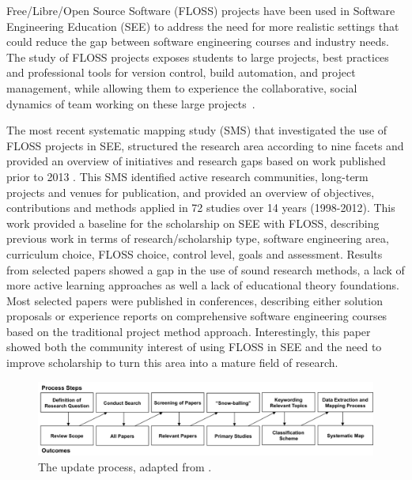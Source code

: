 
Free/Libre/Open Source Software (FLOSS) projects
have been used in Software Engineering Education (SEE)
to address the need for more realistic settings
that could reduce the gap between
software engineering courses and industry needs.
The study of FLOSS projects exposes students to 
large projects, best practices and professional tools 
for version control, build automation, and project management, 
while allowing them to experience the collaborative, social dynamics of team working on these large projects~\cite{Horstmann:2009}.

The most recent systematic mapping study (SMS)  \cite{Petersen,Budgen}
that investigated the use of FLOSS projects in SEE,
structured the research area according to nine facets and
provided an overview of initiatives and research gaps
based on work published prior to 2013 \cite{2015:CSE:nascimento}.
This SMS identified active research communities, long-term projects and venues for publication, and provided an overview of objectives, contributions and methods applied in 72 studies over 14 years (1998-2012). 
This work provided a baseline for the scholarship on SEE with FLOSS, describing previous work in terms of research/scholarship type, software engineering area, curriculum choice, FLOSS choice, control level, goals and assessment. Results from selected papers showed a gap in the use of sound research methods, a lack of more active learning approaches as well a lack of educational theory foundations. Most selected papers were published in conferences, describing either solution proposals or experience reports on comprehensive software engineering courses based on the traditional project method approach. Interestingly, this paper showed both the community interest of using FLOSS in SEE and the need to improve scholarship to turn this area into a mature field of research.

\begin{figure}[tb]
\centering
\includegraphics[width=1\linewidth]{fig/update-process.jpg}
\caption{The update process, adapted from \cite{Petersen,2015:CSE:nascimento}.}
\label{fig_smsProcess3}
\end{figure}
 
